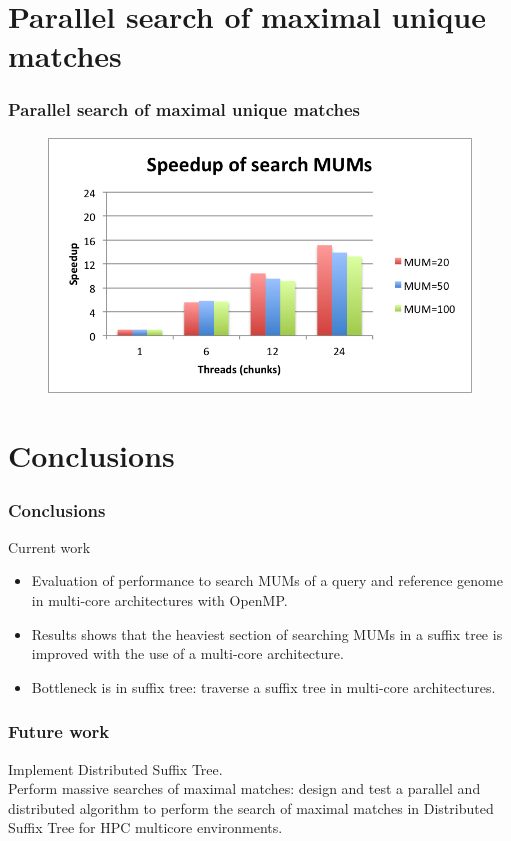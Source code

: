 \documentclass{beamer}
\begin{document}
\section{Parallel search of maximal unique matches}
\begin{frame}
  \frametitle{Parallel search of maximal unique matches}
  \begin{figure}
    \includegraphics[scale=0.8]{speedup.png}
   \end{figure}
\end{frame}
\section{Conclusions}
    \begin{frame}
    \frametitle{Conclusions}
    \begin{block}{Current work}
      \begin{itemize}
        \item Evaluation of performance to search MUMs of a query and reference genome in multi-core architectures with OpenMP.
        \item Results shows that the heaviest section of searching MUMs in a suffix tree is improved with the use of a multi-core architecture. 
        \item Bottleneck is in suffix tree: traverse a suffix tree in multi-core architectures.
      \end{itemize}
\end{block}
\end{frame}
\begin{frame}
  \frametitle{Future work}
\begin{block}{}
Implement Distributed Suffix Tree.\\
Perform massive searches of maximal matches: design and test a parallel and distributed algorithm to perform the search of maximal matches in Distributed Suffix Tree for HPC multicore environments.
\end{block}
\end{frame}
\end{document}

